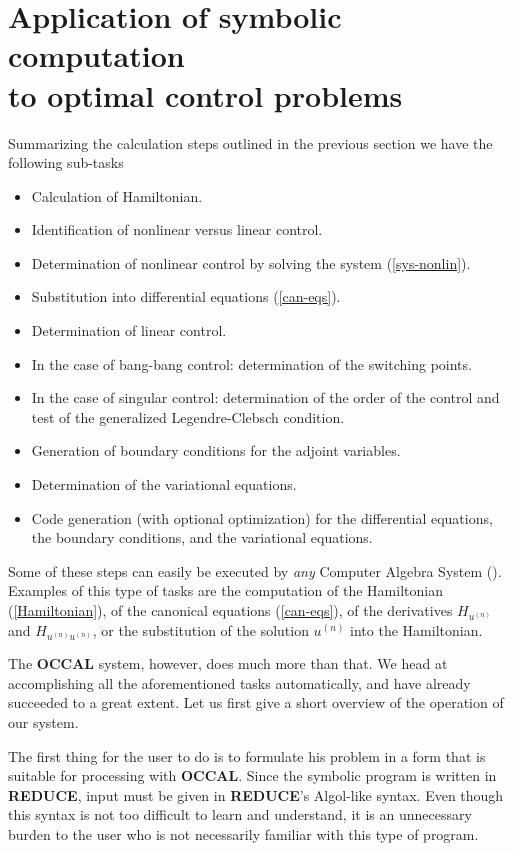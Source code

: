 \documentclass[12pt,a4paper]{article}
\newcommand{\OCCAL}{{\sf\bf OCCAL}}
\newcommand{\REDUCE}{{\sf\bf REDUCE}}
\begin{document}
\section{Application of symbolic computation\protect\\
         to optimal control problems}

\label{sec:operation}

Summarizing the calculation steps outlined in the previous section we
have the following sub-tasks
\begin{itemize}
  \item Calculation of Hamiltonian.
  \item Identification of nonlinear versus linear control.
  \item Determination of nonlinear control by solving the system (\ref{sys-nonlin}).
  \item Substitution into differential equations (\ref{can-eqs}).
  \item Determination of linear control.
  \item In the case of bang-bang control: determination of the switching points.
  \item In the case of singular control: determination of the order of the control
        and test of the generalized Legendre-Clebsch condition.
  \item Generation of boundary conditions for the adjoint variables.
  \item Determination of the variational equations.
  \item Code generation (with optional optimization) for the differential equations,
        the boundary conditions, and the variational equations.
\end{itemize}
Some of these steps can easily be executed by {\em any\/} Computer
Algebra System (). Examples of this type of tasks are the computation of
the Hamiltonian (\ref{Hamiltonian}), of the canonical equations
(\ref{can-eqs}), of the derivatives $H_{u^{(n)}}$ and $H_{u^{(n)}u^{(n)}}$,
or the substitution of the solution $u^{(n)}$ into the Hamiltonian.

The \OCCAL{} system, however, does much more than that. We head at
accomplishing all the aforementioned tasks automatically, and have
already succeeded to a great extent.  Let us first give a short
overview of the operation of our system.

The first thing for the user to do is to formulate his problem in a
form that is suitable for processing with \OCCAL.
Since the symbolic program is written in \REDUCE, input must be given
in \REDUCE's Algol-like syntax. Even though this syntax is not too
difficult to learn and understand, it is an unnecessary burden to the
user who is not necessarily familiar with this type of program.
\end{document}
